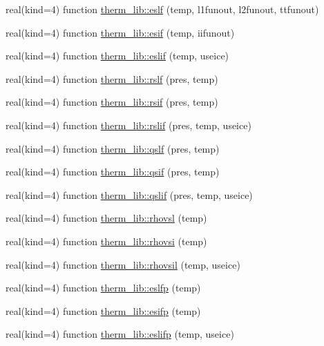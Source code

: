 \begin{DoxyCompactItemize}
\item 
real(kind=4) function \hyperlink{namespacetherm__lib_a82ae02323247d6435153002a309552fb}{therm\+\_\+lib\+::eslf} (temp, l1funout, l2funout, ttfunout)
\item 
real(kind=4) function \hyperlink{namespacetherm__lib_a109004866b1542dfcfa1da1e5130d3c9}{therm\+\_\+lib\+::esif} (temp, iifunout)
\item 
real(kind=4) function \hyperlink{namespacetherm__lib_a5cebdf07920a9af5a0cbc49bafbc30b4}{therm\+\_\+lib\+::eslif} (temp, useice)
\item 
real(kind=4) function \hyperlink{namespacetherm__lib_abd775a071488452f724ab50c60cebe4b}{therm\+\_\+lib\+::rslf} (pres, temp)
\item 
real(kind=4) function \hyperlink{namespacetherm__lib_a16031b6116a46111467e9923e566dd49}{therm\+\_\+lib\+::rsif} (pres, temp)
\item 
real(kind=4) function \hyperlink{namespacetherm__lib_acc637bbfa1fdd9b523e2b1cf3dce2926}{therm\+\_\+lib\+::rslif} (pres, temp, useice)
\item 
real(kind=4) function \hyperlink{namespacetherm__lib_a383a9c98cdc308ddc74f774336a68c70}{therm\+\_\+lib\+::qslf} (pres, temp)
\item 
real(kind=4) function \hyperlink{namespacetherm__lib_a4c010ed765cc5d45d55e2fb76cb3ec89}{therm\+\_\+lib\+::qsif} (pres, temp)
\item 
real(kind=4) function \hyperlink{namespacetherm__lib_a44ab3a68e6060bf4afbfc504e3a8c633}{therm\+\_\+lib\+::qslif} (pres, temp, useice)
\item 
real(kind=4) function \hyperlink{namespacetherm__lib_ade00ab1323488985b9569ba9a5dcde44}{therm\+\_\+lib\+::rhovsl} (temp)
\item 
real(kind=4) function \hyperlink{namespacetherm__lib_a1fbd9c44eee7d212c59b884df5f03718}{therm\+\_\+lib\+::rhovsi} (temp)
\item 
real(kind=4) function \hyperlink{namespacetherm__lib_a981917e8b19e34bc9f094d6aa4416c26}{therm\+\_\+lib\+::rhovsil} (temp, useice)
\item 
real(kind=4) function \hyperlink{namespacetherm__lib_a4339cfce3e15e3410bcc7ba6a7d6ba06}{therm\+\_\+lib\+::eslfp} (temp)
\item 
real(kind=4) function \hyperlink{namespacetherm__lib_a4c1f51941fe39db465e2fba15c887667}{therm\+\_\+lib\+::esifp} (temp)
\item 
real(kind=4) function \hyperlink{namespacetherm__lib_ac882ac1ca8840594af71761fc7c42306}{therm\+\_\+lib\+::eslifp} (temp, useice)

\end{DoxyCompactItemize}
